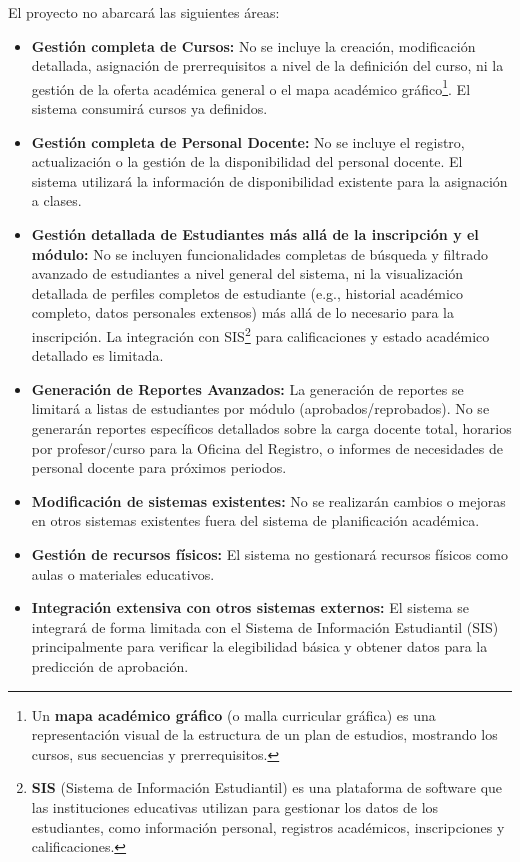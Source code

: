 El proyecto no abarcará las siguientes áreas:
\begin{itemize}
    \item \textbf{Gestión completa de Cursos:} No se incluye la creación, modificación detallada, asignación de prerrequisitos a nivel de la definición del curso, ni la gestión de la oferta académica general o el mapa académico gráfico\footnote{Un \textbf{mapa académico gráfico} (o malla curricular gráfica) es una representación visual de la estructura de un plan de estudios, mostrando los cursos, sus secuencias y prerrequisitos.}.
    El sistema consumirá cursos ya definidos.
    \item \textbf{Gestión completa de Personal Docente:} No se incluye el registro, actualización o la gestión de la disponibilidad del personal docente.
    El sistema utilizará la información de disponibilidad existente para la asignación a clases.
    \item \textbf{Gestión detallada de Estudiantes más allá de la inscripción y el módulo:} No se incluyen funcionalidades completas de búsqueda y filtrado avanzado de estudiantes a nivel general del sistema, ni la visualización detallada de perfiles completos de estudiante (e.g., historial académico completo, datos personales extensos) más allá de lo necesario para la inscripción.
    La integración con SIS\footnote{\textbf{SIS} (Sistema de Información Estudiantil) es una plataforma de software que las instituciones educativas utilizan para gestionar los datos de los estudiantes, como información personal, registros académicos, inscripciones y calificaciones.} para calificaciones y estado académico detallado es limitada.
    \item \textbf{Generación de Reportes Avanzados:} La generación de reportes se limitará a listas de estudiantes por módulo (aprobados/reprobados).
    No se generarán reportes específicos detallados sobre la carga docente total, horarios por profesor/curso para la Oficina del Registro, o informes de necesidades de personal docente para próximos periodos.
    \item \textbf{Modificación de sistemas existentes:} No se realizarán cambios o mejoras en otros sistemas existentes fuera del sistema de planificación académica.
    \item \textbf{Gestión de recursos físicos:} El sistema no gestionará recursos físicos como aulas o materiales educativos.
    \item \textbf{Integración extensiva con otros sistemas externos:} El sistema se integrará de forma limitada con el Sistema de Información Estudiantil (SIS) principalmente para verificar la elegibilidad básica y obtener datos para la predicción de aprobación.

\end{itemize}
